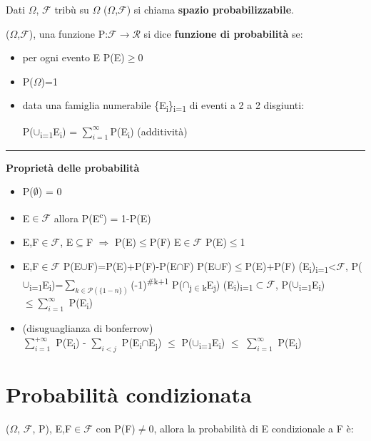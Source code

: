 \documentclass[11pt, letterpaper]{article}
\def\SPSB#1#2{\rlap{\textsuperscript{#1}}\SB{#2}}
\def\SP#1{\textsuperscript{#1}}
\def\SB#1{\textsubscript{#1}}
\def\separator{\begin{center}    \rule{100pt}{0.5pt}\end{center}}
\begin{document}
Dati $\Omega$, $\mathcal{F}$ tribù su $\Omega$ ($\Omega$,$\mathcal{F}$) si chiama \textbf{spazio probabilizzabile}.

($\Omega$,$\mathcal{F}$), una funzione P:$\mathcal{F}\rightarrow\mathcal{R}$ si dice
\textbf{funzione di probabilità} se:
\begin{itemize}
    \item per ogni evento E P(E)$\geq$0
    \item P($\Omega$)=1 
    \item data una famiglia numerabile \{E\SB{i}\}\SPSB{+$\infty$}{i=1} di eventi a 2 a 2 disgiunti:
    \begin{center}
        P($\cup$\SPSB{$\infty$}{i=1}E\SB{i}) = $\sum_{i=1}^{\infty}$P(E\SB{i}) (additività)
    \end{center}
\end{itemize}


\separator

\large{\textbf{Proprietà delle probabilità}}\normalsize
\begin{itemize}
    \item P($\emptyset$) = 0
    \item E$\in\mathcal{F}$ allora P(E\SP{c}) = 1-P(E)
    \item E,F$\in\mathcal{F}$, E$\subseteq$F $\Rightarrow$ P(E)$\leq$P(F)
    \subitem E$\in\mathcal{F}$ P(E)$\leq$1
    \item E,F$\in\mathcal{F}$ P(E$\cup$F)=P(E)+P(F)-P(E$\cap$F)
    \subitem P(E$\cup$F)$\leq$P(E)+P(F)
    \subitem (E\SB{i})\SPSB{n}{i=1}<$\mathcal{F}$, P($\cup$\SPSB{n}{i=1}E\SB{i})=$\sum_{k\in\mathcal{P}(\{1-n\})}$(-1)\SP{\#k+1}
    P($\cap$\SB{j$\in$k}E\SB{j})
    \subitem (E\SB{i})\SPSB{+$\infty$}{i=1}$\subset\mathcal{F}$, P($\cup$\SPSB{$\infty$}{i=1}E\SB{i})$\leq\sum_{i=1}^{\infty}$ 
    P(E\SB{i})
    \item (disuguaglianza di bonferrow) \\
    $\sum_{i=1}^{+\infty}$ P(E\SB{i}) - $\sum_{i<j}$ P(E\SB{i}$\cap$E\SB{j}) $\leq$ P($\cup$\SPSB{+$\infty$}{i=1}E\SB{i}) $\leq$ $\sum_{i=1}^{\infty}$ P(E\SB{i})
\end{itemize}




\section{Probabilità condizionata}

($\Omega$, $\mathcal{F}$, P), E,F$\in\mathcal{F}$ con P(F)$\neq$0, allora la probabilità di E condizionale a F è:
\end{document}
